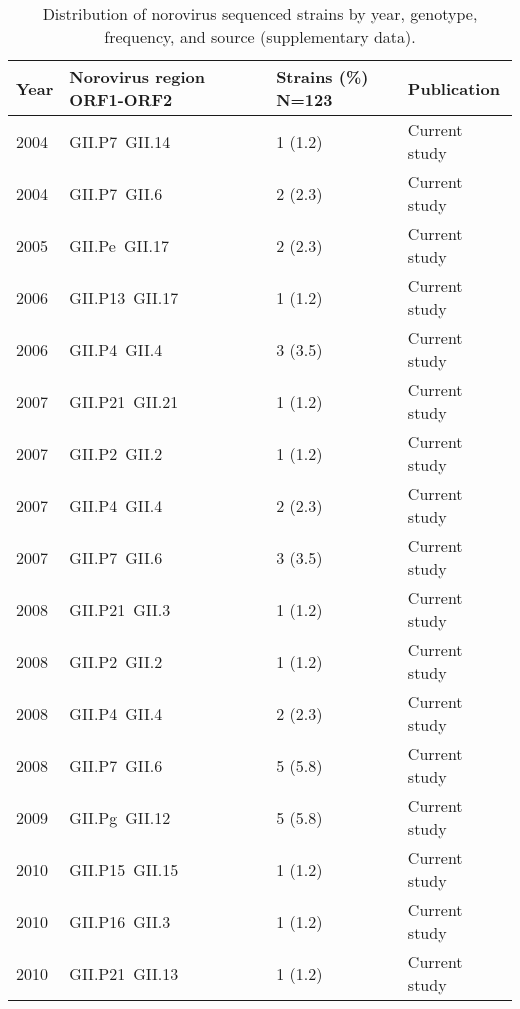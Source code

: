 
\begin{table}[htbp]
    \centering
    \caption{Distribution of norovirus sequenced strains by year, genotype, frequency, and source (supplementary data).}
    \scriptsize
    \begin{tabular}{p{0.6cm}p{3.2cm}p{1.8cm}p{2.5cm}}
        \toprule
        \textbf{Year} & \textbf{Norovirus region ORF1-ORF2} & \textbf{Strains (\%) N=123} & \textbf{Publication} \\
        \midrule
        2004       & GII.P7~GII.14                       & 1 (1.2)  & Current study \\
        2004       & GII.P7~GII.6                        & 2 (2.3)  & Current study \\
        2005       & GII.Pe~GII.17                       & 2 (2.3)  & Current study \\
        2006       & GII.P13~GII.17                      & 1 (1.2)  & Current study \\
        2006       & GII.P4~GII.4                        & 3 (3.5)  & Current study \\
        2007       & GII.P21~GII.21                      & 1 (1.2)  & Current study \\
        2007       & GII.P2~GII.2                        & 1 (1.2)  & Current study \\
        2007       & GII.P4~GII.4                        & 2 (2.3)  & Current study \\
        2007       & GII.P7~GII.6                        & 3 (3.5)  & Current study \\
        2008       & GII.P21~GII.3                       & 1 (1.2)  & Current study \\
        2008       & GII.P2~GII.2                        & 1 (1.2)  & Current study \\
        2008       & GII.P4~GII.4                        & 2 (2.3)  & Current study \\
        2008       & GII.P7~GII.6                        & 5 (5.8)  & Current study \\
        2009       & GII.Pg~GII.12                       & 5 (5.8)  & Current study \\
        2010       & GII.P15~GII.15                      & 1 (1.2)  & Current study \\
        2010       & GII.P16~GII.3                       & 1 (1.2)  & Current study \\
        2010       & GII.P21~GII.13                      & 1 (1.2)  & Current study \\

\end{tabular}
\end{table}
